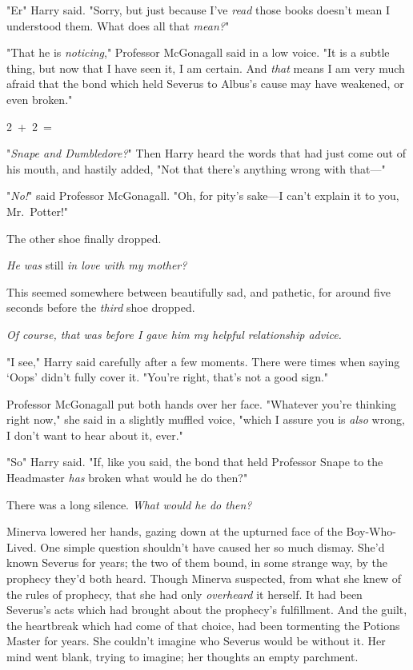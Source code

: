 "Er{\el}" Harry said. "Sorry, but just because I've \emph{read} those books
doesn't mean I understood them. What does all that \emph{mean?}"

"That he is \emph{noticing}," Professor McGonagall said in a low voice. "It is
a subtle thing, but now that I have seen it, I am certain. And \emph{that}
means{\el} I am very much afraid{\el} that the bond which held Severus to
Albus's cause{\el} may have weakened, or even broken."

2~+~2~=~{\el}

"\emph{Snape and Dumbledore?}" Then Harry heard the words that had just come
out of his mouth, and hastily added, "Not that there's anything wrong with
that—"

"\emph{No!}" said Professor McGonagall. "Oh, for pity's sake—I can't explain
it to you, Mr.~Potter!"

The other shoe finally dropped.

\emph{He was} still \emph{in love with my mother?}

This seemed somewhere between beautifully sad, and pathetic, for around five
seconds before the \emph{third} shoe dropped.

\emph{Of course, that was before I gave him my helpful relationship advice.}

"I see," Harry said carefully after a few moments. There were times when saying
`Oops' didn't fully cover it. "You're right, that's not a good sign."

Professor McGonagall put both hands over her face. "Whatever you're thinking
right now," she said in a slightly muffled voice, "which I assure you is
\emph{also} wrong, I don't want to hear about it, ever."

"So{\el}" Harry said. "If, like you said, the bond that held Professor Snape
to the Headmaster \emph{has} broken{\el} what would he do then?"

There was a long silence.
\sbreak
\emph{What would he do then?}

Minerva lowered her hands, gazing down at the upturned face of the
Boy-Who-Lived. One simple question shouldn't have caused her so much dismay.
She'd known Severus for years; the two of them bound, in some strange way, by
the prophecy they'd both heard. Though Minerva suspected, from what she knew of
the rules of prophecy, that she had only \emph{overheard} it herself. It had
been Severus's acts which had brought about the prophecy's fulfillment. And the
guilt, the heartbreak which had come of that choice, had been tormenting the
Potions Master for years. She couldn't imagine who Severus would be without it.
Her mind went blank, trying to imagine; her thoughts an empty parchment.

